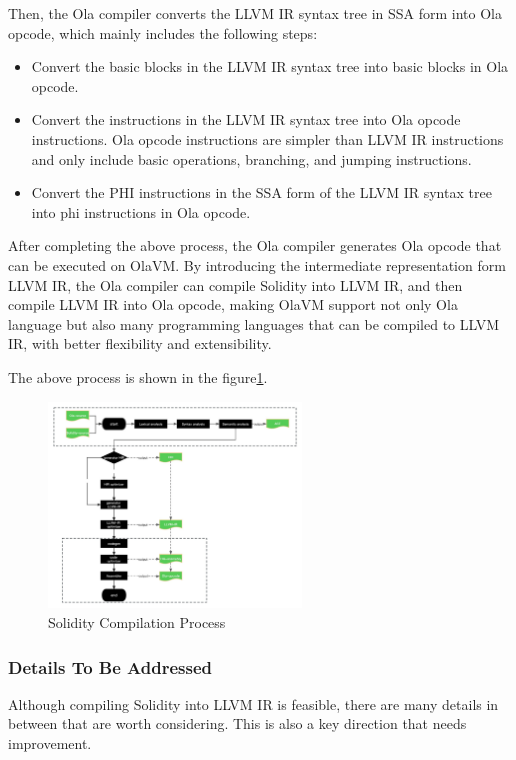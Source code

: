 Then, the Ola compiler converts the LLVM IR syntax tree in SSA form into Ola opcode, which mainly includes the following steps:
\begin{itemize}
    \item Convert the basic blocks in the LLVM IR syntax tree into basic blocks in Ola opcode.
    \item Convert the instructions in the LLVM IR syntax tree into Ola opcode instructions. Ola opcode instructions are simpler than LLVM IR instructions and only include basic operations, branching, and jumping instructions.
    \item Convert the PHI instructions in the SSA form of the LLVM IR syntax tree into phi instructions in Ola opcode.
\end{itemize}
After completing the above process, the Ola compiler generates Ola opcode that can be executed on OlaVM. By introducing the intermediate representation form LLVM IR, the Ola compiler can compile Solidity into LLVM IR, and then compile LLVM IR into Ola opcode, making OlaVM support not only Ola language but also many programming languages that can be compiled to LLVM IR, with better flexibility and extensibility.

The above process is shown in the figure\ref{fig:solidity-compile}.

\begin{figure}[!ht]
    \centering
    \includegraphics[width=0.6\textwidth]{images/solidity-compile.jpg}
    \caption{Solidity Compilation Process}
    \label{fig:solidity-compile}
\end{figure}

\subsubsection{Details To Be Addressed}

Although compiling Solidity into LLVM IR is feasible, there are many details in between that are worth considering. This is also a key direction that needs improvement.

